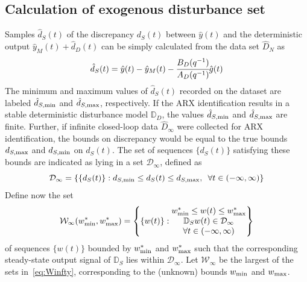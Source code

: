\documentclass[letterpaper, 10 pt, conference]{ieeeconf}  %
\begin{document}
	\subsection{Calculation of exogenous disturbance set}
	\label{Noise}
	Samples $\hat{d}_S(t)$ of the discrepancy $d_S(t)$ between $\hat{y}(t)$ and the deterministic output $\hat{y}_M(t)+\hat{d}_D(t)$ can be simply calculated from the data set $\hat{D}_{N}$ as 
	\begin{equation*}
	\hat{d}_S(t) = \hat{y}(t)-\hat{y}_M(t)-\cfrac{B_D(q^{-1})}{A_D(q^{-1})} \hat{g}(t) 
	\end{equation*}
The minimum and maximum values of $\hat{d}_S(t)$ recorded on the dataset are labeled $\hat{d}_{S,{\rm min}}$ and $\hat{d}_{S,{\rm max}}$, respectively. If the ARX identification results in a stable deterministic disturbance model $\mathbb{D}_D$, the values $\hat{d}_{S,{\rm min}}$ and $\hat{d}_{S,{\rm max}}$ are finite. Further, if infinite closed-loop data $\hat{D}_{\infty}$ were collected for ARX identification, the bounds on discrepancy would be equal to the true bounds $d_{S,{\rm max}}$ and $d_{S,{\rm min}}$ on $d_S(t)$. The set of sequences $\{d_S(t)\}$ satisfying these bounds are indicated as lying in a set $\mathcal{D}_{\infty}$, defined as 
	\begin{equation*}
	\mathcal{D}_{\infty} = \{\{d_S(t)\}: d_{S,{\rm min}} \leq d_S(t) \leq d_{S,{\rm max}}, \hspace{5pt} \forall t \in (-\infty,\infty) \}
	\end{equation*}
Define now the set 
	\begin{equation}
	\hspace{0pt}
	\mathcal{W}_{\infty}(w^*_{\rm min},w^*_{\rm max}) = \begin{Bmatrix} \{w(t)\}: 
	\begin{matrix}
	w^*_{\rm min}\leq w(t)\leq w^*_{\rm max} \\ 
	\mathbb{D}_S w(t) \in \mathcal{D}_{\infty}\\
    \forall t \in (-\infty,\infty) 
	\end{matrix}
	\end{Bmatrix}
    \label{eq:Winfty}
	\end{equation}  
of sequences $\{w(t)\}$  bounded by $w^*_{\rm min}$ and $w^*_{\rm max}$ such that the corresponding steady-state output signal of $\mathbb{D}_S$ lies within $\mathcal{D}_{\infty}$.  Let $\mathcal{W}_{\infty}$ be the largest of the sets in~\eqref{eq:Winfty}, corresponding 
to the (unknown) bounds $w_{\rm min}$ and $w_{\rm max}$.
\end{document}
